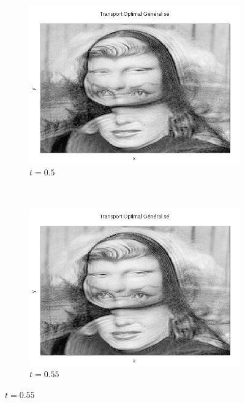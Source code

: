 \documentclass[a4paper,12pt]{article}
\begin{document}
\begin{figure}[!h]
\begin{subfigure}[b]{0.23\linewidth}
\includegraphics[width=\linewidth]{img/2DMorphing/T_00111.png}
\caption*{$t=0.5$}
\end{subfigure}
~
\begin{subfigure}[b]{0.23\linewidth}
\includegraphics[width=\linewidth]{img/2DMorphing/T_00122.png}
\caption*{$t=0.55$}
\end{subfigure}


\end{figure}
\end{document}
